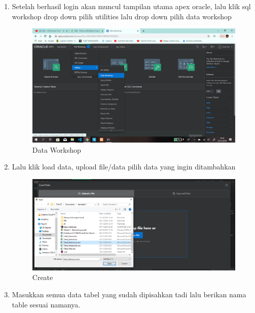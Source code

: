 \begin{enumerate}
    {Account APEX}
    \begin{itemize}
        \item WORKSPACE : tari
        \item USERNAME  : tarippu@gmail.com
        \item PASS      : taritari2
    \end{itemize}
    \newpage
    
    \item Setelah berhasil login akan muncul tampilan utama apex oracle, lalu klik sql workshop drop down pilih utilities lalu drop down pilih data workshop
    \begin{figure}[!htbp]
        \centering
        \includegraphics[width=13cm]{figures/Screenshot(9).png}
        \caption{Data Workshop}
    \end{figure}
     
    \item Lalu klik load data, upload file/data pilih data yang ingin ditambahkan
    \begin{figure}[!htbp]
        \centering
        \includegraphics[width=13cm]{figures/1.PNG}
        \caption{Create}
    \end{figure}
   
    \item Masukkan semua data tabel yang sudah dipisahkan tadi lalu berikan nama table sesuai namanya.
    \newpage 
    

\end{enumerate}
